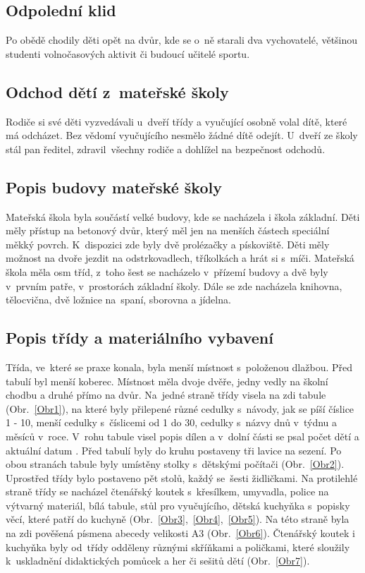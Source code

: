 		\subsection{Odpolední klid}
		\label{spani}
			Po obědě chodily děti opět na dvůr, kde se o~ně starali dva vychovatelé, většinou studenti volnočasových aktivit či budoucí učitelé sportu.

		\subsection{Odchod dětí z~mateřské školy}
			Rodiče si své děti vyzvedávali u~dveří třídy a vyučující osobně volal dítě, které má odcházet. Bez vědomí vyučujícího nesmělo žádné dítě odejít. U~dveří ze školy stál pan ředitel, zdravil všechny rodiče a dohlížel na bezpečnost odchodů. 

		\subsection{Popis budovy mateřské školy}

			Mateřská škola byla součástí velké budovy, kde se nacházela i škola základní. Děti měly přístup na betonový dvůr, který měl jen na menších částech speciální měkký povrch. K~dispozici zde byly dvě prolézačky a pískoviště. Děti měly možnost na dvoře jezdit na odstrkovadlech, tříkolkách a hrát si s~míči. 
			Mateřská škola měla osm tříd, z~toho šest se nacházelo v přízemí budovy a dvě byly v prvním patře, v prostorách základní školy. Dále se zde nacházela knihovna, tělocvična, dvě ložnice na spaní, sborovna a jídelna. 

		\subsection{Popis třídy a materiálního vybavení}
		\label{tridaVybaveni}
			Třída, ve které se praxe konala, byla menší místnost s~položenou dlažbou. Před tabulí byl menší koberec. Místnost měla dvoje dvěře, jedny vedly na školní chodbu a druhé přímo na dvůr.
			Na jedné straně třídy visela na zdi tabule (Obr.~\ref{Obr1}), na které byly přilepené různé cedulky s návody, jak se píší číslice 1 - 10, menší cedulky s~číslicemi od 1 do 30, cedulky s~názvy dnů v týdnu a měsíců v~roce. V~rohu tabule visel popis dílen a v~dolní části se psal počet dětí a aktuální datum . Před tabulí byly do kruhu postaveny tři lavice na sezení. Po obou stranách tabule byly umístěny stolky s dětskými počítači (Obr.~\ref{Obr2}). Uprostřed třídy bylo postaveno pět stolů, každý se šesti židličkami. Na protilehlé straně třídy se nacházel čtenářský koutek s křesílkem, umyvadla, police na výtvarný materiál, bílá tabule, stůl pro vyučujícího, dětská kuchyňka s popisky věcí, které patří do kuchyně (Obr.~\ref{Obr3},~\ref{Obr4},~\ref{Obr5}). Na této straně byla na zdi pověšená písmena abecedy velikosti A3 (Obr.~\ref{Obr6}). Čtenářský koutek i kuchyňka byly od třídy odděleny různými skříňkami a poličkami, které sloužily k uskladnění didaktických pomůcek a her či sešitů dětí (Obr.~\ref{Obr7}).

